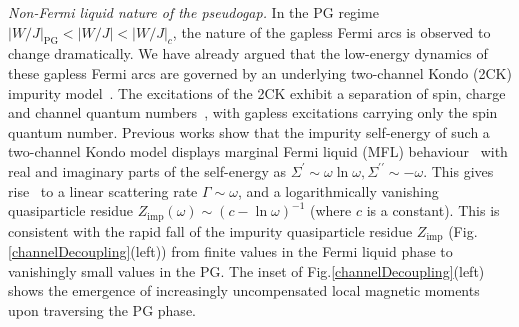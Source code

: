 \documentclass[%
 reprint,
superscriptaddress,
groupedaddress,
 amsmath,amssymb,
 aps,
prl,superscriptaddress
]{revtex4-2}
\begin{document}
\par\noindent\textit{Non-Fermi liquid nature of the pseudogap.}
In the PG regime $|W/J|_{\text{PG}} < |W/J| < |W/J|_{c}$, the nature of the gapless Fermi arcs is observed to change dramatically. We have already argued that the low-energy dynamics of these gapless Fermi arcs are governed by an underlying two-channel Kondo (2CK) impurity model~\cite{Tsvelick_weigmann_mchannel_1985,emery_kivelson}.
The excitations of the 2CK exhibit a separation of spin, charge and channel quantum numbers~\cite{affleck1992}, with gapless excitations carrying only the spin quantum number. Previous works show that the impurity self-energy of such a two-channel Kondo model displays marginal Fermi liquid (MFL) behaviour~\cite{Coleman_tsvelik,Schofield1997,Patra2023MCK} with real and imaginary parts of the self-energy as $\Sigma^{\prime} \sim \omega\ln\omega, \Sigma^{\prime\prime}\sim-\omega$. This gives rise~\cite{varma2002singular} to a linear scattering rate \(\Gamma \sim \omega\), and a logarithmically vanishing quasiparticle residue $Z_\text{imp}(\omega) 
\sim (c - \ln \omega)^{-1}$ (where \(c\) is a constant). 
This is consistent with the rapid fall of the impurity quasiparticle residue $Z_\text{imp}$ (Fig.\ref{channelDecoupling}(left)) from finite values in the Fermi liquid phase to vanishingly small values in the PG. The inset of Fig.\ref{channelDecoupling}(left) shows the emergence of increasingly uncompensated local magnetic moments upon traversing the PG phase. 
\end{document}

